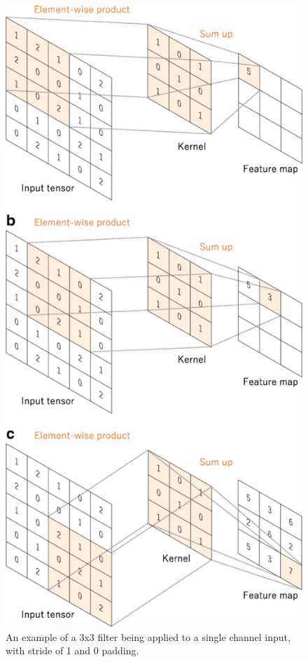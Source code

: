 \documentclass[12pt]{article}
\numberwithin{equation}{section}
\numberwithin{figure}{section}
\begin{document}
\begin{figure}
	\centering
	\captionsetup{justification=centering}
	\includegraphics[scale=0.25]{cnn_application.png}
	\caption{An example of a 3x3 filter being applied to a single channel input, with stride of 1 and 0 padding. \cite{Yamashita2018}}
	\label{fig:conv_process}
\end{figure}
\end{document}
